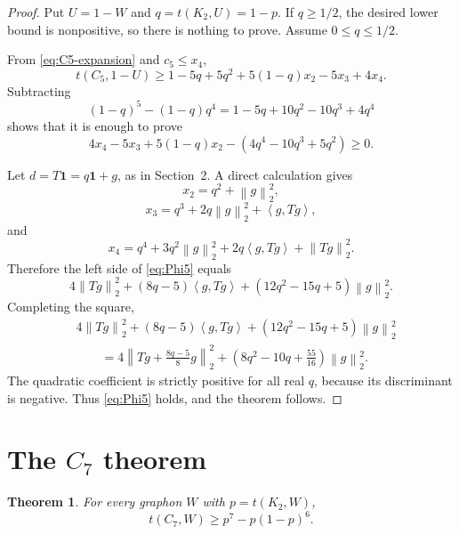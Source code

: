 \documentclass[11pt]{article}
\newtheorem{theorem}{Theorem}[section]
\newcommand{\one}{\mathbf 1}
\newcommand{\ip}[2]{\left\langle #1,#2\right\rangle}
\newcommand{\norm}[1]{\left\|#1\right\|}
\begin{document}
\begin{proof}
Put $U=1-W$ and $q=t(K_2,U)=1-p$.  If $q\ge1/2$, the desired lower bound is nonpositive, so there is nothing to prove.  Assume $0\le q\le1/2$.

From \eqref{eq:C5-expansion} and $c_5\le x_4$,
\[
        t(C_5,1-U)
        \ge 1-5q+5q^2+5(1-q)x_2-5x_3+4x_4.
\]
Subtracting
\[
        (1-q)^5-(1-q)q^4
        =1-5q+10q^2-10q^3+4q^4
\]
shows that it is enough to prove
\begin{equation}\label{eq:Phi5}
        4x_4-5x_3+5(1-q)x_2-(4q^4-10q^3+5q^2)\ge0.
\end{equation}

Let $d=T\one=q\one+g$, as in Section~2.  A direct calculation gives
\[
        x_2=q^2+\norm{g}_2^2,
\]
\[
        x_3=q^3+2q\norm{g}_2^2+\ip{g}{Tg},
\]
and
\[
        x_4=q^4+3q^2\norm{g}_2^2+2q\ip{g}{Tg}+\norm{Tg}_2^2.
\]
Therefore the left side of \eqref{eq:Phi5} equals
\[
        4\norm{Tg}_2^2+(8q-5)\ip{g}{Tg}+(12q^2-15q+5)\norm{g}_2^2.
\]
Completing the square,
\[
\begin{aligned}
&4\norm{Tg}_2^2+(8q-5)\ip{g}{Tg}+(12q^2-15q+5)\norm{g}_2^2\\
&\qquad =4\left\|Tg+\frac{8q-5}{8}g\right\|_2^2
+\left(8q^2-10q+\frac{55}{16}\right)\norm{g}_2^2.
\end{aligned}
\]
The quadratic coefficient is strictly positive for all real $q$, because its discriminant is negative.  Thus \eqref{eq:Phi5} holds, and the theorem follows.
\end{proof}

\section{The $C_7$ theorem}\label{sec:C7}

\begin{theorem}\label{thm:C7}
For every graphon $W$ with $p=t(K_2,W)$,
\[
        t(C_7,W)\ge p^7-p(1-p)^6.
\]
\end{theorem}
\end{document}
